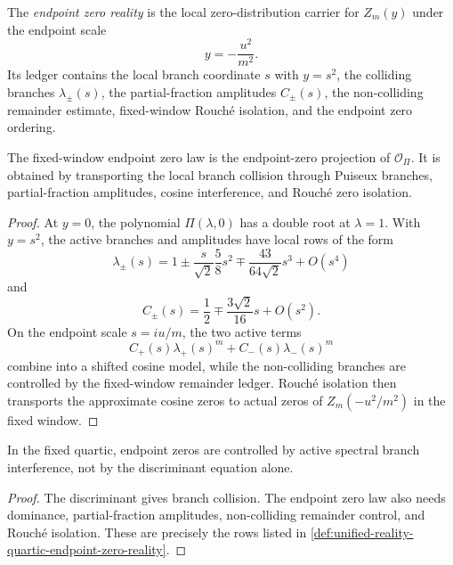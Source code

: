 \begin{definition}
\label{def:unified-reality-quartic-endpoint-zero-reality}
The \emph{endpoint zero reality} is the local zero-distribution carrier
for $Z_m(y)$ under the endpoint scale
$$
y=-\frac{u^2}{m^2}.
$$
Its ledger contains the local branch coordinate $s$ with $y=s^2$, the
colliding branches $\lambda_{\pm}(s)$, the partial-fraction amplitudes
$C_{\pm}(s)$, the non-colliding remainder estimate, fixed-window
Rouch\'e isolation, and the endpoint zero ordering.
\end{definition}

\begin{theorem}
\label{thm:unified-reality-quartic-endpoint-zero-branch-interference}
The fixed-window endpoint zero law is the endpoint-zero projection of
$\mathcal O_{\Pi}$. It is obtained by transporting the local branch
collision through Puiseux branches, partial-fraction amplitudes, cosine
interference, and Rouch\'e zero isolation.
\end{theorem}

\begin{proof}
At $y=0$, the polynomial $\Pi(\lambda,0)$ has a double root at
$\lambda=1$. With $y=s^2$, the active branches and amplitudes have local
rows of the form
$$
\lambda_{\pm}(s)
=
1\pm\frac{s}{\sqrt2}
\frac58s^2
\mp\frac{43}{64\sqrt2}s^3
+O(s^4)
$$
and
$$
C_{\pm}(s)
=
\frac12
\mp\frac{3\sqrt2}{16}s
+O(s^2).
$$
On the endpoint scale $s=iu/m$, the two active terms
$$
C_+(s)\lambda_+(s)^m+C_-(s)\lambda_-(s)^m
$$
combine into a shifted cosine model, while the non-colliding branches
are controlled by the fixed-window remainder ledger. Rouch\'e isolation
then transports the approximate cosine zeros to actual zeros of
$Z_m(-u^2/m^2)$ in the fixed window.
\end{proof}

\begin{corollary}
\label{cor:unified-reality-quartic-endpoint-zeros-not-discriminant}
In the fixed quartic, endpoint zeros are controlled by active spectral
branch interference, not by the discriminant equation alone.
\end{corollary}

\begin{proof}
The discriminant gives branch collision. The endpoint zero law also
needs dominance, partial-fraction amplitudes, non-colliding remainder
control, and Rouch\'e isolation. These are precisely the rows listed in
\autoref{def:unified-reality-quartic-endpoint-zero-reality}.
\end{proof}

